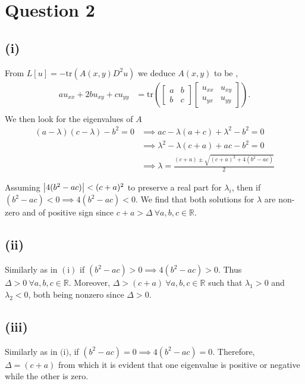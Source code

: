 \documentclass[
	12pt,
	]{article}
\theoremstyle{definition}
\theoremstyle{definition}
\theoremstyle{definition}
\theoremstyle{definition}
\theoremstyle{definition}
\theoremstyle{example}
\theoremstyle{note}
\theoremstyle{remark}
\theoremstyle{example}
\begin{document}
			\section*{Question 2}
				\subsection*{(i)}
				From $L[u] = -\text{tr}(A(x,y)D^{2}u)$ we deduce $A(x,y)$ to be ,
				\begin{align*} au_{xx} + 2bu_{xy} + cu_{yy} &= \text{tr}\left( \begin{bmatrix}a & b \\ b& c \end{bmatrix}\begin{bmatrix} u_{xx} & u_{xy} \\ u_{yx} & u_{yy}\end{bmatrix}\right). \\
				\end{align*}
				We then look for the eigenvalues of $A$
				\begin{align*}
				 (a-\lambda)(c-\lambda) - b^2 = 0 &\implies ac - \lambda(a+c) + \lambda^2 -b^2 =0 \\
				&\implies \lambda^2 -\lambda(c+a) + ac-b^2 =0 \\
				&\implies \lambda = \frac{(c+a) \pm \sqrt{(c+a)^2 +4(b^2 -ac)}}{2}
				\end{align*}
				
				\noindent Assuming $\abs{4(b^{2} - ac)} < (c+a)^{2}$ to preserve a real part for $\lambda_{i}$, then if $(b^2 - ac)<0 \implies 4(b^{2} - ac)<0$. We find that both solutions for $\lambda$ are non-zero and of positive sign since $c+a > \Delta \ \forall a,b,c \in \mathbb{R}$.
				\subsection*{(ii)}
					Similarly as in $(\text{i})$ if $(b^{2} - ac) > 0 \implies 4(b^{2} - ac)>0 $. Thus $\Delta > 0  \ \forall a,b,c \in \mathbb{R}$. Moreover, $\Delta > (c+a) \ \forall a,b,c \in \mathbb{R}$ such that $\lambda_{1} >0$ and $\lambda_{2} < 0$, both being nonzero since $\Delta > 0$.
				\subsection*{(iii)}
					Similarly as in $\text{(i)}$, if $(b^{2}- ac) = 0 \implies 4(b^{2}-ac) = 0$. Therefore, $\Delta  = (c+a)$ from which it is evident that one eigenvalue is positive or negative while the other is zero.
\end{document}
